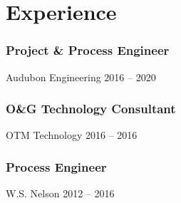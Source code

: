 %
%
\section{Experience}
  \subsubsection{Project \& Process Engineer}
  \position%
    {Audubon Engineering}%
    {2016 -- 2020}%
    \Location
  \subsubsection{O\&G Technology Consultant}
  \position%
    {OTM Technology}%
    {2016 -- 2016}%
    \Location
  \subsubsection{Process Engineer}
  \position%
    {W.S. Nelson}%
    {2012 -- 2016}%
    \Location
%
%
%